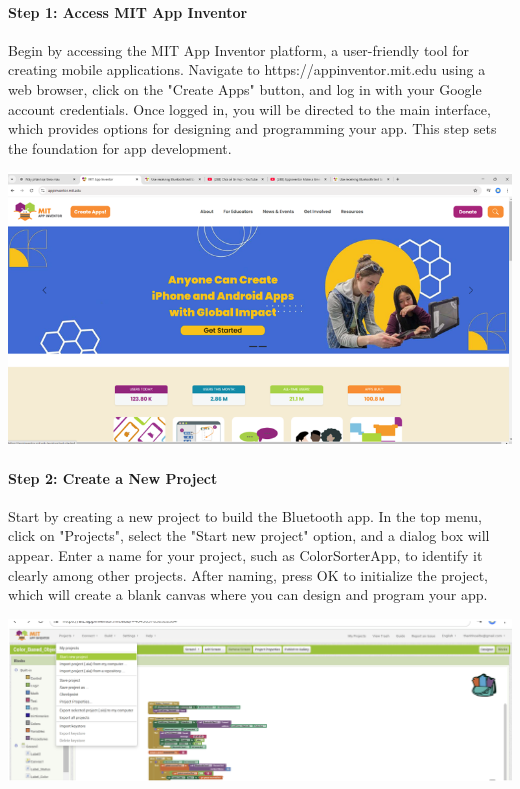 \documentclass[conference, onecolumn]{IEEEtran}
\begin{document}
\paragraph{Step 1: Access MIT App Inventor}  
Begin by accessing the MIT App Inventor platform, a user-friendly tool for creating mobile applications. Navigate to https://appinventor.mit.edu using a web browser, click on the "Create Apps" button, and log in with your Google account credentials. Once logged in, you will be directed to the main interface, which provides options for designing and programming your app. This step sets the foundation for app development.

\begin{center}
    \includegraphics[width=0.9\linewidth]{Access MIT App Inventor.png}
    \label{fig1}
    \end{center}
 \vspace{3em}
\noindent


\paragraph{Step 2: Create a New Project}  
Start by creating a new project to build the Bluetooth app. In the top menu, click on "Projects", select the "Start new project" option, and a dialog box will appear. Enter a name for your project, such as ColorSorterApp, to identify it clearly among other projects. After naming, press OK to initialize the project, which will create a blank canvas where you can design and program your app.

\begin{center}
    \includegraphics[width=0.9\linewidth]{IOT Create a new Project.png}
    \label{fig1}
    \end{center}
\noindent
\end{document}
